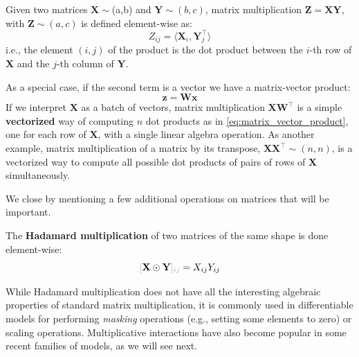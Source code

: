 \begin{definition} \addbottle
Given two matrices $\mathbf{X}\sim $(a,b) and $\mathbf{Y}\sim (b,c)$, matrix multiplication $\mathbf{Z} = \mathbf{X}\mathbf{Y}$, with $\mathbf{Z} \sim (a,c)$ is defined element-wise as:
%
\begin{equation}
    Z_{ij} = \langle \mathbf{X}_i, \mathbf{Y}^\top_j \rangle
    \label{eq:matrix_multiplication}
\end{equation}
%
\noindent i.e., the element $(i,j)$ of the product is the dot product between the $i$-th row of $\mathbf{X}$ and the $j$-th column of $\mathbf{Y}$.
\end{definition}
%
 As a special case, if the second term is a vector we have a matrix-vector product:
%
\begin{equation}
\mathbf{z} = \mathbf{W}\mathbf{x}
\label{eq:matrix_vector_product}
\end{equation}
%
If we interpret $\mathbf{X}$ as a batch of vectors, matrix multiplication $\mathbf{X}\mathbf{W}^\top$ is a simple \textbf{vectorized} way of computing $n$ dot products as in \eqref{eq:matrix_vector_product}, one for each row of $\mathbf{X}$, with a single linear algebra operation. As another example, matrix multiplication of a matrix by its transpose, $\mathbf{X}\mathbf{X}^\top \sim(n,n)$, is a vectorized way to compute all possible dot products of pairs of rows of $\mathbf{X}$ simultaneously.

We close by mentioning a few additional operations on matrices that will be important. 

\begin{definition}
The \textbf{Hadamard multiplication} of two matrices of the same shape is done element-wise:
%
\begin{equation*}
\idx{\mathbf{X}\odot \mathbf{Y}}{ij} = {X}_{ij}{Y}_{ij}    
\end{equation*}
\end{definition}
%
While Hadamard multiplication does not have all the interesting algebraic properties of standard matrix multiplication, it is commonly used in differentiable models for performing \textit{masking} operations (e.g., setting some elements to zero) or scaling operations. Multiplicative interactions have also become popular in some recent families of models, as we will see next.

